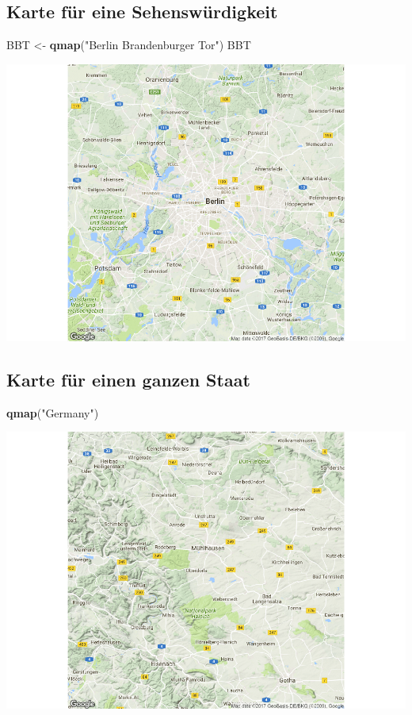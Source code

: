 \documentclass[]{article}
\newenvironment{Shaded}{\begin{snugshade}}{\end{snugshade}}
\newcommand{\KeywordTok}[1]{\textcolor[rgb]{0.13,0.29,0.53}{\textbf{{#1}}}}
\newcommand{\StringTok}[1]{\textcolor[rgb]{0.31,0.60,0.02}{{#1}}}
\newcommand{\NormalTok}[1]{{#1}}
\begin{document}
\subsection{Karte für eine
Sehenswürdigkeit}\label{karte-fur-eine-sehenswurdigkeit}

\begin{Shaded}
\begin{Highlighting}[]
\NormalTok{BBT <-}\StringTok{ }\KeywordTok{qmap}\NormalTok{(}\StringTok{"Berlin Brandenburger Tor"}\NormalTok{)}
\NormalTok{BBT}
\end{Highlighting}
\end{Shaded}

\includegraphics{Intro_Datenanalyse1_files/figure-latex/unnamed-chunk-239-1.pdf}

\subsection{Karte für einen ganzen
Staat}\label{karte-fur-einen-ganzen-staat}

\begin{Shaded}
\begin{Highlighting}[]
\KeywordTok{qmap}\NormalTok{(}\StringTok{"Germany"}\NormalTok{)}
\end{Highlighting}
\end{Shaded}

\includegraphics{Intro_Datenanalyse1_files/figure-latex/unnamed-chunk-240-1.pdf}
\end{document}
